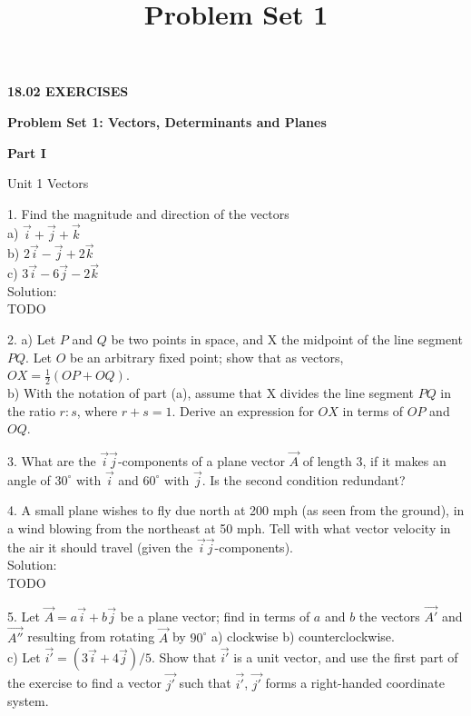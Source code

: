 \documentclass{article}
\title{Problem Set 1}
\author{}
\date{}
\begin{document}
\begin{center}
{\rmfamily\bfseries\Large 18.02 EXERCISES}

\vspace{25px}

{\rmfamily\bfseries\LARGE Problem Set 1: Vectors, Determinants and Planes}

{\rmfamily\bfseries\large Part I}
\end{center}

Unit 1 Vectors

1. Find the magnitude and direction of the vectors\\
a) $\vec{i} + \vec{j} + \vec{k}$ \\
b) $2\vec{i} - \vec{j} + 2\vec{k}$ \\
c) $3\vec{i} - 6\vec{j} - 2\vec{k}$ \\
Solution:\\
TODO

2. a) Let $P$ and $Q$ be two points in space, and X the midpoint of the line
segment $PQ$. Let $O$ be an arbitrary fixed point; show that as vectors, $OX =
\frac{1}{2}(OP + OQ)$.\\
b) With the notation of part (a), assume that X divides the line segment $PQ$
in the ratio $r:s$, where $r + s = 1$. Derive an expression for $OX$ in terms
of $OP$ and $OQ$.

3. What are the $\vec{i} \vec{j}$-components of a plane vector $\vec{A}$ of
length 3, if it makes an angle of $30^{\circ}$ with $\vec{i}$ and $60^{\circ}$
with $\vec{j}$. Is the second condition redundant?

4. A small plane wishes to fly due north at 200 mph (as seen from the ground),
in a wind blowing from the northeast at 50 mph. Tell with what vector velocity
in the air it should travel (given the $\vec{i} \vec{j}$-components).\\
Solution:\\
TODO

5. Let $\vec{A} = a \vec{i} + b \vec{j}$ be a plane vector; find in terms of
$a$ and $b$ the vectors $\vec{A'}$ and $\vec{A''}$ resulting from rotating
$\vec{A}$ by $90^{\circ}$ \hspace{10px} a) clockwise \hspace{10px} b)
counterclockwise.\\
c) Let $\vec{i'} = (3 \vec{i} + 4 \vec{j}) / 5$. Show that $\vec{i'}$ is a unit
vector, and use the first part of the exercise to find a vector $\vec{j'}$ such
that $\vec{i'}$, $\vec{j'}$ forms a right-handed coordinate system.
\end{document}
